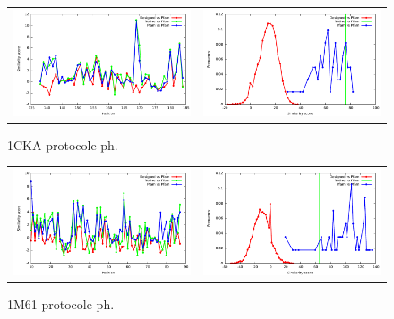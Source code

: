 \documentclass[a4paper,12pt]{article}
\begin{document}
   \begin{figure}[t]
     \centering
     \begin{tabular}{cc}
       \includegraphics[width=8.45cm]{gen_08032012/1CKA/ph/similarity_bypos.pdf} &
       \includegraphics[width=8.45cm]{gen_08032012/1CKA/ph/similarity_byseq_frequency.pdf} \\
     \end{tabular}
     
     \caption{1CKA protocole ph.}
     \label{1CKA}
   \end{figure}
   \begin{figure}[t]
     \centering
     \begin{tabular}{cc}
       \includegraphics[width=8.45cm]{gen_08032012/1M61/ph/similarity_bypos.pdf} &
       \includegraphics[width=8.45cm]{gen_08032012/1M61/ph/similarity_byseq_frequency.pdf} \\
     \end{tabular}
     
     \caption{1M61 protocole ph.}
     \label{1M61}
   \end{figure}
\end{document}
